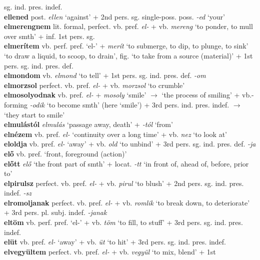 \documentclass[11pt]{article}
\begin{document}
sg. ind. pres. indef. \\
\textbf{ellened} post. \emph{ellen} `against' + 2nd
pers. sg. single\hyp{}poss. poss. \emph{-ed} `your' \\
\textbf{elmerengnem} lit. formal, perfect. vb. pref. \emph{el-} + vb. \emph{mereng}
`to ponder, to mull over smth' + inf. 1st pers. sg. \\
\textbf{elmerítem} vb. perf. pref. `el-' + \emph{merít} `to
submerge, to dip, to plunge, to sink' \textbar\textbar{} `to draw a
liquid, to scoop, to drain', fig. `to take from a source
(material)' + 1st pers. sg. ind. pres. def. \\
\textbf{elmondom} vb. \emph{elmond} `to tell' + 1st
pers. sg. ind. pres. def. \emph{-om} \\
\textbf{elmorzsol} perfect. vb. pref. \emph{el-} +
vb. \emph{morzsol} `to crumble' \\
\textbf{elmosolyodnak} vb. pref. \emph{el-}
+ \emph{mosoly} `smile' $\rightarrow$ `the process of smiling' +
vb.-forming \emph{-odik} `to become smth' (here `smile') + 3rd
pers. ind. pres. indef. $\rightarrow$ `they start to smile' \\
\textbf{elmulástól} \emph{elmulás} `passage away, death' + \emph{-tól}
`from' \\
\textbf{elnézem} vb. pref. \emph{el-} `continuity over a long time' +
vb. \emph{nez} `to look at' \\
\textbf{eloldja} vb. pref. \emph{el-} `away' + vb. \emph{old} `to
  unbind' + 3rd pers. sg. ind. pres. def. \emph{-ja} \\
\textbf{elő} vb. pref. `front, foreground (action)' \\
\textbf{előtt} \emph{elő} `the front part of smth' + locat. \emph{-tt}
  `in front of, ahead of, before, prior to' \\
\textbf{elpirulsz} perfect. vb. pref. \emph{el-} + vb. \emph{pirul}
`to blush' + 2nd pers. sg. ind. pres. indef. \emph{-sz} \\
\textbf{elromoljanak} perfect. vb. pref. \emph{el-} +
vb. \emph{romlik} `to break down, to deteriorate' + 3rd
pers. pl. subj. indef. \emph{-janak} \\
\textbf{eltöm} vb. perf. pref. `el-' + vb. \emph{töm} `to fill, to
stuff' + 3rd pers. sg. ind. pres. indef. \\
\textbf{elüt} vb. pref. \emph{el-} `away' + vb. \emph{üt} `to hit' +
3rd pers. sg. ind. pres. indef. \\
\textbf{elvegyültem} perfect. vb. pref. \emph{el-} +
vb. \emph{vegyül} `to mix, blend' + 1st
\end{document}
